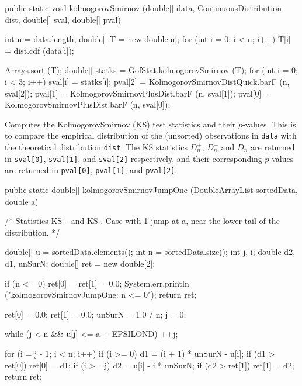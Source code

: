 \begin{code}

   public static void kolmogorovSmirnov (double[] data,
                                         ContinuousDistribution dist,
                                         double[] sval,
                                         double[] pval)\begin{hide} {
      int n = data.length;
      double[] T = new double[n];
      for (int i = 0; i < n; i++) {
         T[i] = dist.cdf (data[i]);
      }

      Arrays.sort (T);
      double[] statks = GofStat.kolmogorovSmirnov (T);
      for (int i = 0; i < 3; i++) {
         sval[i] = statks[i];
      }
      pval[2] = KolmogorovSmirnovDistQuick.barF (n, sval[2]);
      pval[1] = KolmogorovSmirnovPlusDist.barF (n, sval[1]);
      pval[0] = KolmogorovSmirnovPlusDist.barF (n, sval[0]);
   }\end{hide}
\end{code}
\begin{tabb} Computes the KolmogorovSmirnov (KS) test statistics and their $p$-values.
  This is to compare the empirical distribution of the (unsorted) observations
  in \texttt{data}
 with the theoretical distribution \texttt{dist}. The KS statistics
  $D_n^+$, $D_n^-$ and $D_n$ are returned in \texttt{sval[0]}, \texttt{sval[1]},
  and \texttt{sval[2]} respectively, and their corresponding $p$-values
  are returned in \texttt{pval[0]}, \texttt{pval[1]}, and \texttt{pval[2]}.
\end{tabb}
\begin{htmlonly}
\end{htmlonly}
\begin{code}

   public static double[] kolmogorovSmirnovJumpOne (DoubleArrayList sortedData,
                                                    double a)\begin{hide} {
      /* Statistics KS+ and KS-. Case with 1 jump at a, near the lower tail of
         the distribution. */

      double[] u = sortedData.elements();
      int n = sortedData.size();
      int j, i;
      double d2, d1, unSurN;
      double[] ret = new double[2];

      if (n <= 0) {
         ret[0] = ret[1] = 0.0;
         System.err.println ("kolmogorovSmirnovJumpOne: n <= 0");
         return ret;
      }

      ret[0] = 0.0;
      ret[1] = 0.0;
      unSurN = 1.0 / n;
      j = 0;

      while (j < n && u[j] <= a + EPSILOND) ++j;

      for (i = j - 1; i < n; i++) {
         if (i >= 0) {
            d1 = (i + 1) * unSurN - u[i];
            if (d1 > ret[0])
               ret[0] = d1;
         }
         if (i >= j) {
            d2 = u[i] - i * unSurN;
            if (d2 > ret[1])
               ret[1] = d2;
         }
      }
      return ret;
   }\end{hide}
\end{code}
